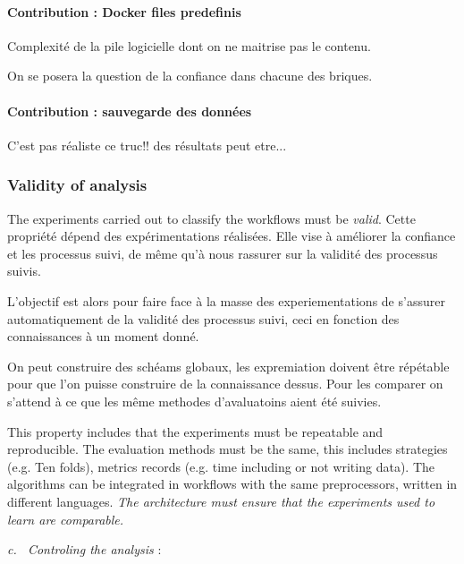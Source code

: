 \documentclass{llncs}
\newcommand{\todo}[1]{\todo[inline]{#1}}
\newcounter{NoReq}
\newcommand{\req}[3]{\refstepcounter{NoReq} \textit{c.\theNoReq~{#2}}\label{#1} : {#3}}
\begin{document}
\paragraph{Contribution : Docker files predefinis}
Complexité de la pile logicielle dont on ne maitrise pas le contenu. 


On se posera la question de la confiance dans chacune des briques.

\paragraph{Contribution : sauvegarde des données}
C'est pas réaliste ce truc!! des résultats peut etre...




\subsubsection{Validity of analysis}
The experiments carried out to classify the workflows must be \textit{valid}.
Cette propriété dépend des expérimentations réalisées. Elle vise à améliorer la confiance et les processus suivi, de même qu'à nous rassurer sur la validité des processus suivis.

L'objectif est alors pour faire face à la masse des experiementations de s'assurer automatiquement de la validité des processus suivi, ceci en fonction des connaissances à un moment donné. 

On peut construire des schéams globaux, les expremiation doivent être répétable pour que l'on puisse construire de la connaissance dessus. Pour les comparer on s'attend à ce que les même methodes d'avaluatoins aient été suivies. 

This property includes that the experiments must be repeatable and reproducible. The evaluation methods must be the same, this includes strategies (e.g. Ten folds), metrics records (e.g. time including or not writing data). The algorithms can be integrated in workflows with the same preprocessors, written in different languages. \textit{The architecture must ensure that the experiments used to learn are comparable.}

\req{control}{
Controling the analysis}{

}



\end{document}
